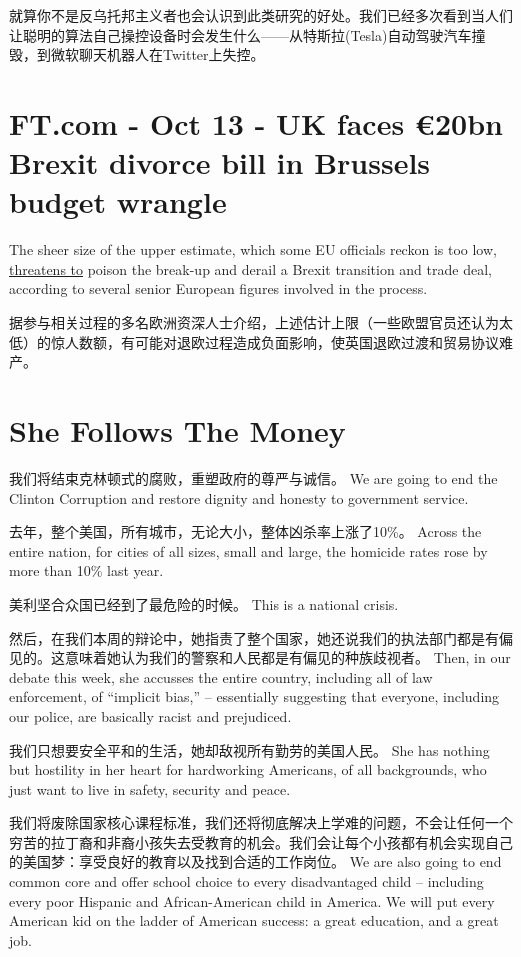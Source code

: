 \documentclass[UTF8]{ctexart}
\begin{document}
就算你不是反乌托邦主义者也会认识到此类研究的好处。我们已经多次看到当人们让聪明的算法自己操控设备时会发生什么——从特斯拉(Tesla)自动驾驶汽车撞毁，到微软聊天机器人在Twitter上失控。

\section{FT.com - Oct 13 - UK faces €20bn Brexit divorce bill in Brussels budget wrangle}
The sheer size of the upper estimate, which some EU officials reckon is too low, \underline{threatens to} poison the break-up and derail a Brexit transition and trade deal, according to several senior European figures involved in the process.

据参与相关过程的多名欧洲资深人士介绍，上述估计上限（一些欧盟官员还认为太低）的惊人数额，有可能对退欧过程造成负面影响，使英国退欧过渡和贸易协议难产。


\section{She Follows The Money}
我们将结束克林顿式的腐败，重塑政府的尊严与诚信。
We are going to end the Clinton Corruption and restore dignity and honesty to government service.

去年，整个美国，所有城市，无论大小，整体凶杀率上涨了10\%。
Across the entire nation, for cities of all sizes, small and large, the homicide rates rose by more than 10\% last year.

美利坚合众国已经到了最危险的时候。
This is a national crisis.

然后，在我们本周的辩论中，她指责了整个国家，她还说我们的执法部门都是有偏见的。这意味着她认为我们的警察和人民都是有偏见的种族歧视者。
Then, in our debate this week, she accusses the entire country, including all of law enforcement, of “implicit bias,” – essentially suggesting that everyone, including our police, are basically racist and prejudiced.

我们只想要安全平和的生活，她却敌视所有勤劳的美国人民。
She has nothing but hostility in her heart for hardworking Americans, of all backgrounds, who just want to live in safety, security and peace.

我们将废除国家核心课程标准，我们还将彻底解决上学难的问题，不会让任何一个穷苦的拉丁裔和非裔小孩失去受教育的机会。我们会让每个小孩都有机会实现自己的美国梦：享受良好的教育以及找到合适的工作岗位。
We are also going to end common core and offer school choice to every disadvantaged child – including every poor Hispanic and African-American child in America. We will put every American kid on the ladder of American success: a great education, and a great job.
\end{document}
